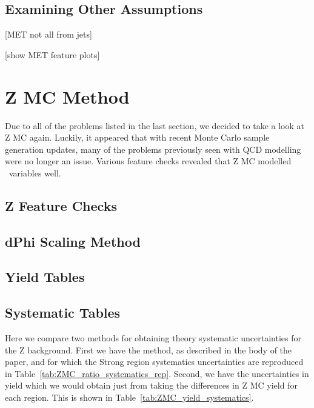 \subsection*{Examining Other Assumptions}

[MET not all from jets]

[show MET feature plots]

\section{Z MC Method}

Due to all of the problems listed in the last section, we decided to take a look at Z MC again. Luckily, it appeared that with recent Monte Carlo sample generation updates, many of the problems previously seen with QCD modelling were no longer an issue. Various feature checks revealed that Z MC modelled \MET\ variables well.

\subsection*{Z Feature Checks}

\subsection*{dPhi Scaling Method}

\subsection*{Yield Tables}

\subsection*{Systematic Tables}

Here we compare two methods for obtaining theory systematic uncertainties for the Z background. First we have the \mindphijm method, as described in the body of the paper, and for which the Strong region systematics uncertainties are reproduced in Table~\ref{tab:ZMC_ratio_systematics_rep}. Second, we have the uncertainties in yield which we would obtain just from taking the differences in Z MC yield for each region. This is shown in Table~\ref{tab:ZMC_yield_systematics}.

